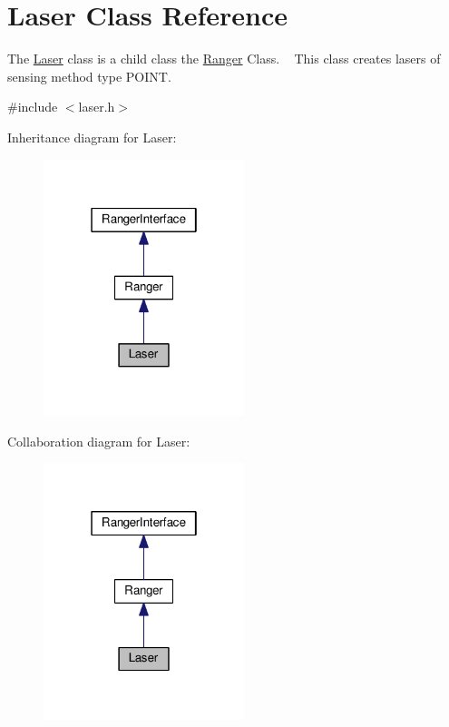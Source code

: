 \hypertarget{classLaser}{}\section{Laser Class Reference}
\label{classLaser}


The \hyperlink{classLaser}{Laser} class is a child class the \hyperlink{classRanger}{Ranger} Class. ~\newline
 This class creates lasers of sensing method type P\+O\+I\+NT.  




{\ttfamily \#include $<$laser.\+h$>$}



Inheritance diagram for Laser\+:\nopagebreak
\begin{figure}[H]
\begin{center}
\leavevmode
\includegraphics[width=166pt]{classLaser__inherit__graph}
\end{center}
\end{figure}


Collaboration diagram for Laser\+:\nopagebreak
\begin{figure}[H]
\begin{center}
\leavevmode
\includegraphics[width=166pt]{classLaser__coll__graph}
\end{center}
\end{figure}

